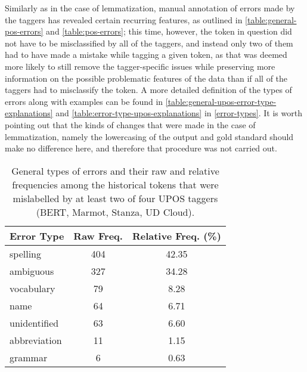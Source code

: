 Similarly as in the case of lemmatization, manual annotation of errors made by the taggers has revealed certain recurring features, as outlined in \autoref{table:general-pos-errors} and \autoref{table:pos-errors}; this time, however, the token in question did not have to be misclassified by all of the taggers, and instead only two of them had to have made a mistake while tagging a given token, as that was deemed more likely to still remove the tagger-specific issues while preserving more information on the possible problematic features of the data than if all of the taggers had to misclassify the token. A more detailed definition of the types of errors along with examples can be found in \autoref{table:general-upos-error-type-explanations} and \autoref{table:error-type-upos-explanations} in \autoref{error-types}. It is worth pointing out that the kinds of changes that were made in the case of lemmatization, namely the lowercasing of the output and gold standard should make no difference here, and therefore that procedure was not carried out. 

\renewcommand{\arraystretch}{1.25}
\begin{table}[H]
\begin{center}
\begin{tabular}{|l|cc|}
\hline \bf Error Type & \bf Raw Freq. & \bf Relative Freq. (\%) \\ \hline
spelling & 404 & 42.35 \\
ambiguous & 327 & 34.28 \\
vocabulary & 79 & 8.28 \\
name & 64 & 6.71 \\
unidentified & 63 & 6.60 \\
abbreviation & 11 & 1.15 \\
grammar & 6 & 0.63 \\
\hline
\end{tabular}
\caption{\label{table:general-pos-errors} General types of errors and their raw and relative frequencies among the historical tokens that were mislabelled by at least two of four UPOS taggers (BERT, Marmot, Stanza, UD Cloud).}
\end{center}
\end{table}


